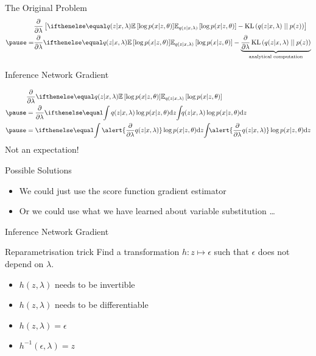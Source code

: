 \documentclass[14pt, aspectratio=169]{beamer}
\begin{document}
\begin{frame}{The Original Problem}
\begin{equation*}
\begin{aligned}
&\pdv{\lambda}\left[\E[q(z|x,\lambda)]{\log p(x|z,\theta)} - \KL{q(z|x,\lambda)}{p(z)} \right] \\ \pause
=&\pdv{\lambda}\E[q(z|x,\lambda)]{\log p(x|z,\theta)} - \underbrace{\pdv{\lambda}\KL{q(z|x,\lambda)}{p(z)}}_{\text{analytical computation}} \\
\end{aligned}
\end{equation*}
\pause
{}
\end{frame}

\begin{frame}{Inference Network Gradient}

\begin{equation*}
\begin{aligned}
&\pdv{\lambda}\E[q(z|x,\lambda)]{\log p(x|z,\theta)} \\ \pause
&= \pdv{\lambda} \intl{q(z|x,\lambda)\log p(x|z,\theta)}{z} \\ \pause
&= \intl{\alert{\pdv{\lambda} q(z|x,\lambda)}\log p(x|z,\theta)}{z}
\end{aligned}
\end{equation*}
\pause
Not an expectation!
\end{frame}

\begin{frame}{Possible Solutions}
\begin{itemize}
\item We could just use the score function gradient estimator
\item Or we could use what we have learned about variable substitution \ldots
\end{itemize}
\end{frame}

\begin{frame}{Inference Network Gradient}
\begin{block}{Reparametrisation trick}
Find a transformation $ h: z \mapsto \epsilon $ such that $ \epsilon $ does not depend on $ \lambda $.
\begin{itemize}
\item $ h(z, \lambda) $ needs to be invertible
\item $ h(z, \lambda) $ needs to be differentiable
\pause
\item $ h(z, \lambda) = \epsilon $
\item $ h^{-1}(\epsilon, \lambda) = z $ 
\end{itemize}
\end{block}
\end{frame}
\end{document}
